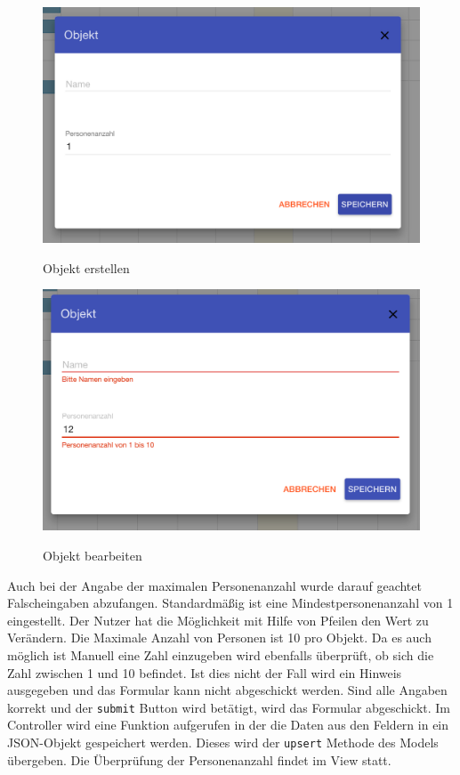 \begin{figure}[H]
    \centering
    \begin{minipage}[t]{0.49\linewidth}
        \centering
        \includegraphics[width=\linewidth]{images/frontend_resource_new.png}
        \label{frontend_resource_new}
        \caption{Objekt erstellen}
    \end{minipage}%
    \hfill
    \begin{minipage}[t]{0.49\linewidth}
        \centering
        \includegraphics[width=\linewidth]{images/frontend_resource_fail.png}
        \label{frontend_resource_fail}
        \caption{Objekt bearbeiten}
    \end{minipage}
\end{figure}


 Auch bei der Angabe der maximalen Personenanzahl wurde darauf geachtet Falscheingaben abzufangen. Standardmäßig ist eine Mindestpersonenanzahl von 1 eingestellt. Der Nutzer hat die Möglichkeit mit Hilfe von Pfeilen den Wert zu Verändern. Die Maximale Anzahl von Personen ist 10 pro Objekt. Da es auch möglich ist Manuell eine Zahl einzugeben wird ebenfalls überprüft, ob sich die Zahl zwischen 1 und 10 befindet. Ist dies nicht der Fall wird ein Hinweis ausgegeben und das Formular kann nicht abgeschickt werden. Sind alle Angaben korrekt und der \texttt{submit} Button wird betätigt, wird das Formular abgeschickt. Im Controller wird eine Funktion aufgerufen in der die Daten aus den Feldern in ein JSON-Objekt gespeichert werden. Dieses wird der \texttt{upsert} Methode des Models übergeben. Die Überprüfung der Personenanzahl findet im View statt. 
 
